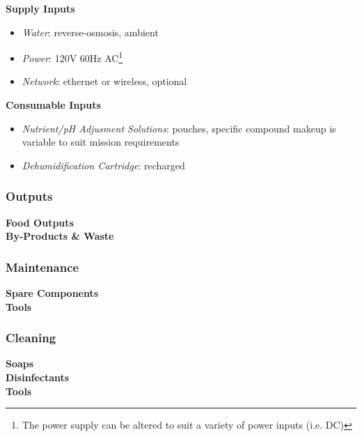 \textbf{Supply Inputs}
\begin{itemize}
    \item \textit{Water}: reverse-osmosis, ambient
    \item \textit{Power}: 120V 60Hz AC\footnote{The power supply can be altered to suit a variety of power inputs (i.e. DC)}
    \item \textit{Network}: ethernet or wireless, optional
\end{itemize}

\textbf{Consumable Inputs}
\begin{itemize}
    \item \textit{Nutrient/pH Adjusment Solutions}: pouches, specific compound makeup is variable to suit mission requirements
    \item \textit{Dehumidification Cartridge}: recharged
\end{itemize}

\subsubsection{Outputs}

\textbf{Food Outputs}\\


\textbf{By-Products \& Waste}\\


\subsubsection{Maintenance}

\textbf{Spare Components}\\


\textbf{Tools}\\


\subsubsection{Cleaning}

\textbf{Soaps}\\


\textbf{Disinfectants}\\


\textbf{Tools}\\

